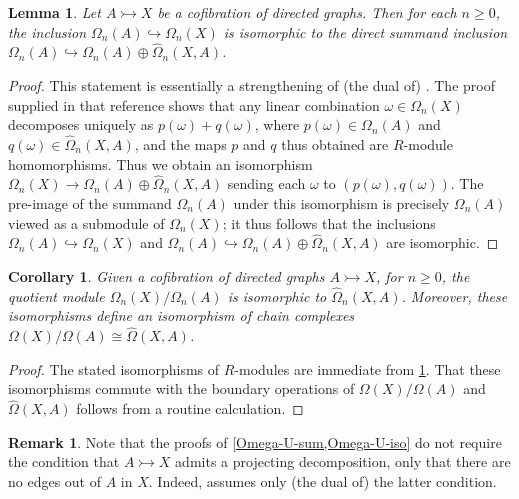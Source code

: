 \documentclass[11pt]{article}
\newtheorem{corollary}[theo]{Corollary}
\newtheorem{lemma}[theo]{Lemma}
\theoremstyle{definition}
\newtheorem{remark}[theo]{Remark}
\numberwithin{equation}{section}
\newcommand{\tOmega}{\widehat{\Omega}}
\newcommand{\cto}{\rightarrowtail}
\begin{document}
\begin{lemma}\label{Omega-U-sum}
Let $A \cto X$ be a cofibration of directed graphs. Then for each $n \geq 0$, the inclusion $\Omega_n(A) \hookrightarrow \Omega_n(X)$ is isomorphic to the direct summand inclusion $\Omega_n(A) \hookrightarrow \Omega_n(A) \oplus \tOmega_n(X,A)$.
\end{lemma}

\begin{proof}
This statement is essentially a strengthening of (the dual of) \cite[Lem.~3.10]{grigor'yan-jimenez-muranov-yau}. The proof supplied in that reference shows that any linear combination $\omega \in \Omega_n(X)$ decomposes uniquely as $p(\omega) + q(\omega)$, where $p(\omega) \in \Omega_n(A)$ and $q(\omega) \in \tOmega_n(X,A)$, and the maps $p$ and $q$ thus obtained are $R$-module homomorphisms. Thus we obtain an isomorphism $\Omega_n(X) \to \Omega_n(A) \oplus \tOmega_n(X,A)$ sending each $\omega$ to $(p(\omega),q(\omega))$. The pre-image of the summand $\Omega_n(A)$ under this isomorphism is precisely $\Omega_n(A)$ viewed as a submodule of $\Omega_n(X)$; it thus follows that the inclusions $\Omega_n(A) \hookrightarrow \Omega_n(X)$ and $\Omega_n(A) \hookrightarrow \Omega_n(A) \oplus \tOmega_n(X,A)$ are isomorphic.
\end{proof}

\begin{corollary} \label{Omega-U-iso}
Given a cofibration of directed graphs $A \cto X$, for $n \geq 0$, the quotient module $\Omega_n(X) / \Omega_n(A)$ is isomorphic to $\tOmega_n(X,A)$. Moreover, these isomorphisms define an isomorphism of chain complexes $\Omega(X) / \Omega(A) \cong \tOmega(X,A)$.
\end{corollary}

\begin{proof}
The stated isomorphisms of $R$-modules are immediate from \cref{Omega-U-sum}. That these isomorphisms commute with the boundary operations of $\Omega(X) / \Omega(A)$ and $\tOmega(X,A)$ follows from a routine calculation.
\end{proof}

\begin{remark}
Note that the proofs of \cref{Omega-U-sum,Omega-U-iso} do not require the condition that $A \cto X$ admits a projecting decomposition, only that there are no edges out of $A$ in $X$. Indeed, \cite[Lem.~3.10]{grigor'yan-jimenez-muranov-yau} assumes only (the dual of) the latter condition.
\end{remark}
\end{document}
